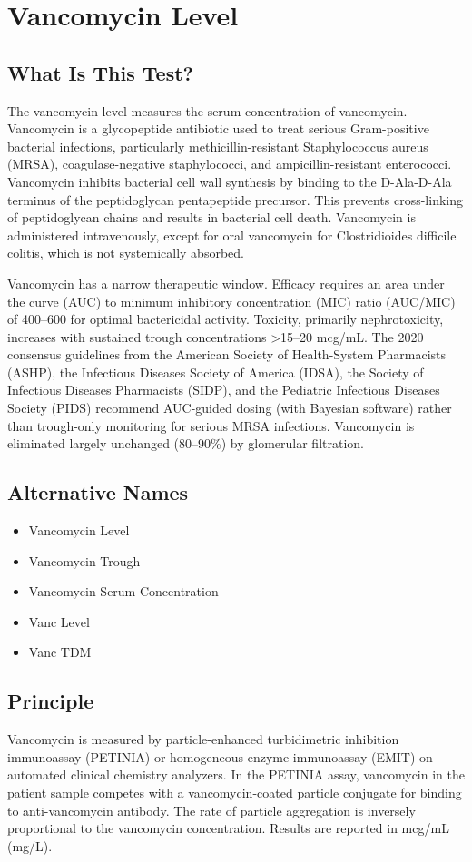 \chapter{Vancomycin Level}

\section*{What Is This Test?}
The vancomycin level measures the serum concentration of vancomycin. Vancomycin is a glycopeptide antibiotic used to treat serious Gram-positive bacterial infections, particularly methicillin-resistant Staphylococcus aureus (MRSA), coagulase-negative staphylococci, and ampicillin-resistant enterococci. Vancomycin inhibits bacterial cell wall synthesis by binding to the D-Ala-D-Ala terminus of the peptidoglycan pentapeptide precursor. This prevents cross-linking of peptidoglycan chains and results in bacterial cell death. Vancomycin is administered intravenously, except for oral vancomycin for Clostridioides difficile colitis, which is not systemically absorbed.

Vancomycin has a narrow therapeutic window. Efficacy requires an area under the curve (AUC) to minimum inhibitory concentration (MIC) ratio (AUC/MIC) of 400--600 for optimal bactericidal activity. Toxicity, primarily nephrotoxicity, increases with sustained trough concentrations >15--20 mcg/mL. The 2020 consensus guidelines from the American Society of Health-System Pharmacists (ASHP), the Infectious Diseases Society of America (IDSA), the Society of Infectious Diseases Pharmacists (SIDP), and the Pediatric Infectious Diseases Society (PIDS) recommend AUC-guided dosing (with Bayesian software) rather than trough-only monitoring for serious MRSA infections. Vancomycin is eliminated largely unchanged (80--90\%) by glomerular filtration.

\section*{Alternative Names}
\begin{itemize}
  \item Vancomycin Level
  \item Vancomycin Trough
  \item Vancomycin Serum Concentration
  \item Vanc Level
  \item Vanc TDM
\end{itemize}
\section*{Principle}
Vancomycin is measured by particle-enhanced turbidimetric inhibition immunoassay (PETINIA) or homogeneous enzyme immunoassay (EMIT) on automated clinical chemistry analyzers. In the PETINIA assay, vancomycin in the patient sample competes with a vancomycin-coated particle conjugate for binding to anti-vancomycin antibody. The rate of particle aggregation is inversely proportional to the vancomycin concentration. Results are reported in mcg/mL (mg/L).

